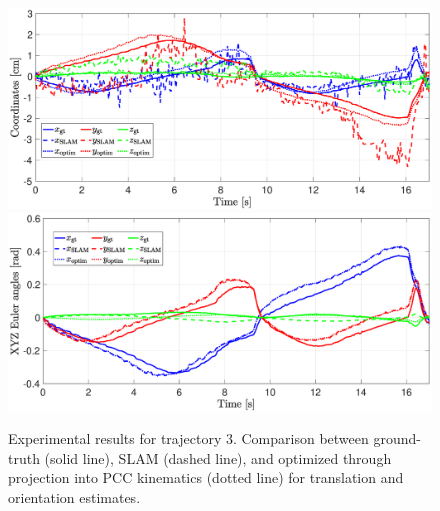 \begin{figure}[ht]
    \centering
    \includegraphics[width=0.9\columnwidth, trim={2cm 1.2cm 2cm 0}]{srslam/figures/vtem28_t3_coordinates.eps}\\
    \includegraphics[width=0.9\columnwidth, trim={2cm 0 2cm 1.2cm}]{srslam/figures/vtem28_t3_angles.eps}
    \caption{ Experimental results for trajectory 3. Comparison between ground-truth (solid line), \gls{SLAM} (dashed line), and optimized through projection into \gls{PCC} kinematics (dotted line) for translation and orientation estimates.}
    \label{fig:srslam:experiments_t3_over_time}
\end{figure}

